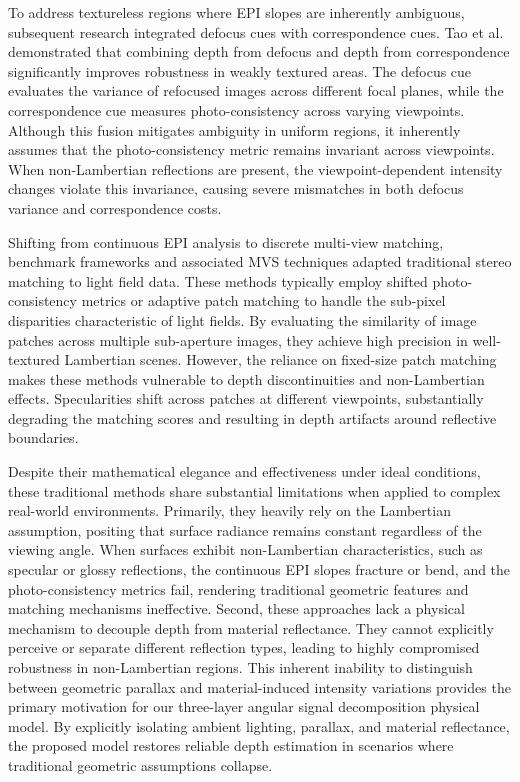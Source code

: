 \documentclass[lettersize,journal]{IEEEtran}
\begin{document}
To address textureless regions where EPI slopes are inherently ambiguous, subsequent research integrated defocus cues with correspondence cues. Tao et al. \cite{ng2005} demonstrated that combining depth from defocus and depth from correspondence significantly improves robustness in weakly textured areas. The defocus cue evaluates the variance of refocused images across different focal planes, while the correspondence cue measures photo-consistency across varying viewpoints. Although this fusion mitigates ambiguity in uniform regions, it inherently assumes that the photo-consistency metric remains invariant across viewpoints. When non-Lambertian reflections are present, the viewpoint-dependent intensity changes violate this invariance, causing severe mismatches in both defocus variance and correspondence costs.

Shifting from continuous EPI analysis to discrete multi-view matching, benchmark frameworks and associated MVS techniques \cite{honauer2016} adapted traditional stereo matching to light field data. These methods typically employ shifted photo-consistency metrics or adaptive patch matching to handle the sub-pixel disparities characteristic of light fields. By evaluating the similarity of image patches across multiple sub-aperture images, they achieve high precision in well-textured Lambertian scenes. However, the reliance on fixed-size patch matching makes these methods vulnerable to depth discontinuities and non-Lambertian effects. Specularities shift across patches at different viewpoints, substantially degrading the matching scores and resulting in depth artifacts around reflective boundaries.

Despite their mathematical elegance and effectiveness under ideal conditions, these traditional methods share substantial limitations when applied to complex real-world environments. Primarily, they heavily rely on the Lambertian assumption, positing that surface radiance remains constant regardless of the viewing angle. When surfaces exhibit non-Lambertian characteristics, such as specular or glossy reflections, the continuous EPI slopes fracture or bend, and the photo-consistency metrics fail, rendering traditional geometric features and matching mechanisms ineffective. Second, these approaches lack a physical mechanism to decouple depth from material reflectance. They cannot explicitly perceive or separate different reflection types, leading to highly compromised robustness in non-Lambertian regions. This inherent inability to distinguish between geometric parallax and material-induced intensity variations provides the primary motivation for our three-layer angular signal decomposition physical model. By explicitly isolating ambient lighting, parallax, and material reflectance, the proposed model restores reliable depth estimation in scenarios where traditional geometric assumptions collapse.
\end{document}
